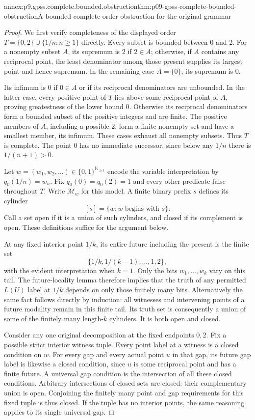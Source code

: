 \begin{annexitem}{annex:p9.gpss.complete.bounded.obstruction}{thm:p09-gpss-complete-bounded-obstruction}{A bounded complete-order obstruction for the original grammar}
\begin{proof}
We first verify completeness of the displayed order
\(T=\{0,2\}\cup\{1/n:n\geq1\}\) directly.
Every subset is bounded between 0 and 2. For a nonempty
subset \(A\), its supremum is 2 if \(2\in A\);
otherwise, if \(A\) contains any reciprocal point,
the least denominator among those present supplies
its largest point and hence supremum. In the remaining
case \(A=\{0\}\), its supremum is 0.

Its infimum is 0 if \(0\in A\) or if its reciprocal
denominators are unbounded. In the latter case,
every positive point of \(T\) lies above some
reciprocal point of \(A\), proving greatestness
of the lower bound 0. Otherwise its reciprocal
denominators form a bounded subset of the positive
integers and are finite. The positive members of
\(A\), including a possible 2, form a finite
nonempty set and have a smallest member, its
infimum. These cases exhaust all nonempty subsets.
Thus \(T\) is complete. The point 0 has no immediate
successor, since below any \(1/n\) there is
\(1/(n+1)>0\).

Let \(w=(w_1,w_2,\ldots)\in\{0,1\}^{\mathbb N_{\geq1}}\)
encode the variable interpretation by
\(q_0(1/n)=w_n\). Fix \(q_0(0)=q_0(2)=1\)
and every other predicate false throughout \(T\).
Write \(\mathcal M_w\) for this model. A finite
binary prefix \(s\) defines its cylinder
\[
 [s]=\{w:w\text{ begins with }s\}.
\]
Call a set open if it is a union of such cylinders,
and closed if its complement is open. These
definitions suffice for the argument below.

At any fixed interior point \(1/k\), its entire
future including the present is the finite set
\[
                       \{1/k,1/(k-1),\ldots,1,2\},
\]
with the evident interpretation when \(k=1\).
Only the bits \(w_1,\ldots,w_k\) vary on this tail.
The future-locality lemma therefore implies that
the truth of any permitted \(L(U)\) label at
\(1/k\) depends on only those finitely many bits.
Alternatively the same fact follows directly by
induction: all witnesses and intervening points
of a future modality remain in this finite tail.
Its truth set is consequently a union of some
of the finitely many length-\(k\) cylinders.
It is both open and closed.

Consider any one original decomposition at
the fixed endpoints \(0,2\). Fix a possible
strict interior witness tuple. Every point
label at a witness is a closed condition on
\(w\). For every gap and every actual point
\(u\) in that gap, its future gap label is
likewise a closed condition, since \(u\)
is some reciprocal point and has a finite
future. A universal gap condition is the
intersection of all these closed conditions.
Arbitrary intersections of closed sets are
closed: their complementary union is open.
Conjoining the finitely many point and gap
requirements for this fixed tuple is thus
closed. If the tuple has no interior points,
the same reasoning applies to its single
universal gap.


\end{proof}
\end{annexitem}
